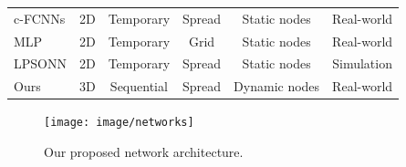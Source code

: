\documentclass{ieeeaccess}
\begin{document}
\begin{table}[ht]
\begin{tabular}{l|l|l|l|l|l}
		c-FCNNs\cite{bernas2015fully}& 
		\multicolumn{1}{c}{2D}                   &      
		\multicolumn{1}{c}{Temporary}                 &   \multicolumn{1}{c}{Spread \checkmark}                   & 
		\multicolumn{1}{c}{Static nodes}        &   \multicolumn{1}{c}{Real-world  \checkmark}   \\ 
		
		MLP\cite{kumar2016localization}& 
		\multicolumn{1}{c}{2D}                   &      
		\multicolumn{1}{c}{Temporary}                 &   \multicolumn{1}{c}{Grid}                   & 
		\multicolumn{1}{c}{Static nodes}        &   \multicolumn{1}{c}{Real-world  \checkmark}   \\ 
		LPSONN\cite{banihashemian2018new}&     
		\multicolumn{1}{c}{2D}                   &      
		\multicolumn{1}{c}{Temporary}                 &   \multicolumn{1}{c}{Spread  \checkmark}                   & 
		\multicolumn{1}{c}{Static nodes}        &   \multicolumn{1}{c}{Simulation}   \\ 
		
		Ours&
		\multicolumn{1}{c}{3D \checkmark}                   &      
		\multicolumn{1}{c}{Sequential \checkmark}                 &   \multicolumn{1}{c}{Spread \checkmark}                   & 
		\multicolumn{1}{c}{Dynamic nodes \checkmark}        &   \multicolumn{1}{c}{Real-world \checkmark}   \\ 
		\bottomrule
	\end{tabular}
	\label{table:related_worsk}
	
\end{table}

\begin{figure}[h]
	\centering
	\texttt{[image: image/networks]}
	\caption{Our proposed network architecture.}
	\label{fig:our_network}
\end{figure}
\end{document}
